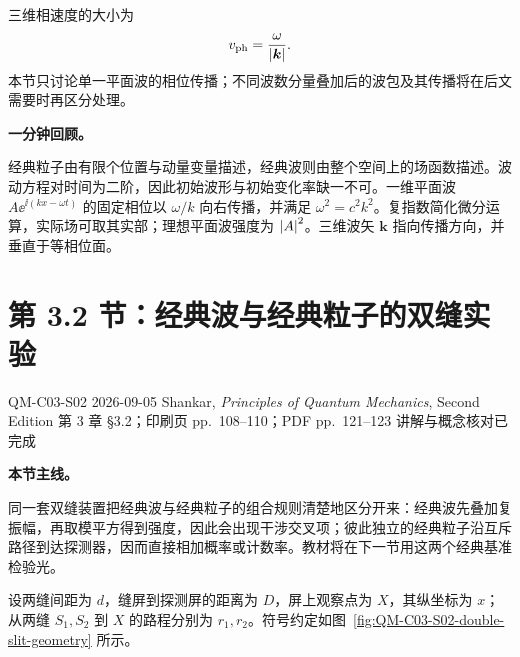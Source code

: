三维相速度的大小为
\begin{equation}
  v_{\mathrm{ph}}=\frac{\omega}{\left|\bm k\right|}.
  \label{eq:QM-C03-S01-three-dimensional-phase-velocity}
\end{equation}
本节只讨论单一平面波的相位传播；不同波数分量叠加后的波包及其传播将在后文需要时再区分处理。

\textbf{一分钟回顾。}

经典粒子由有限个位置与动量变量描述，经典波则由整个空间上的场函数描述。波动方程对时间为二阶，因此初始波形与初始变化率缺一不可。一维平面波 $A\ee^{\ii(kx-\omega t)}$ 的固定相位以 $\omega/k$ 向右传播，并满足 $\omega^2=c^2k^2$。复指数简化微分运算，实际场可取其实部；理想平面波强度为 $\left|A\right|^2$。三维波矢 $\bm k$ 指向传播方向，并垂直于等相位面。

\section{第 3.2 节：经典波与经典粒子的双缝实验}
\label{section:QM-C03-S02}

\studymeta
  {QM-C03-S02}
  {2026-09-05}
  {Shankar, \textit{Principles of Quantum Mechanics}, Second Edition}
  {第 3 章 \S 3.2；印刷页 pp.~108--110；PDF pp.~121--123}
  {讲解与概念核对已完成}

\textbf{本节主线。}

同一套双缝装置把经典波与经典粒子的组合规则清楚地区分开来：经典波先叠加复振幅，再取模平方得到强度，因此会出现干涉交叉项；彼此独立的经典粒子沿互斥路径到达探测器，因而直接相加概率或计数率。教材将在下一节用这两个经典基准检验光。


设两缝间距为 $d$，缝屏到探测屏的距离为 $D$，屏上观察点为 $X$，其纵坐标为 $x$；从两缝 $S_1,S_2$ 到 $X$ 的路程分别为 $r_1,r_2$。符号约定如图~\ref{fig:QM-C03-S02-double-slit-geometry} 所示。


